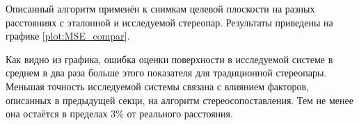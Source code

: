 Описанный алгоритм применён к снимкам целевой плоскости на разных расстояниях с эталонной и исследуемой стереопар.
Результаты приведены на графике \ref{plot:MSE_compar}.


Как видно из графика, ошибка оценки поверхности в исследуемой системе в среднем в два раза больше этого показателя для
традиционной стереопары. Меньшая точность исследуемой системы связана с влиянием факторов, описанных в предыдущей секци,
на алгоритм стереосопоставления.  Тем не менее она остаётся в пределах $3\%$ от реального расстояния.  %



